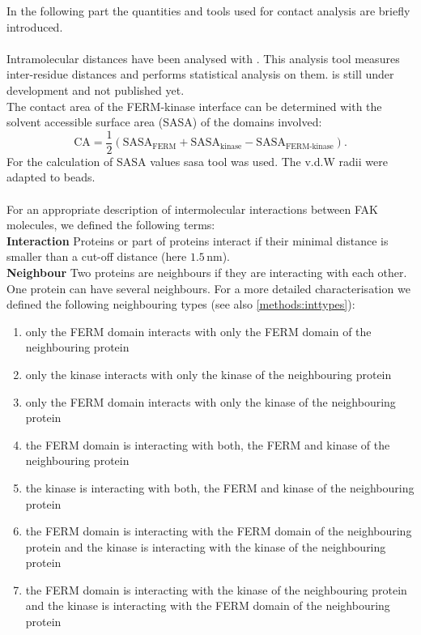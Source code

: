In the following part the quantities and tools used for contact analysis are briefly introduced.\\
\\
Intramolecular distances have been analysed with \conan{}. This analysis tool measures inter-residue distances and performs statistical analysis on them. \conan{} is still under development and not published yet.\\
The contact area of the FERM-kinase interface can be determined with the solvent accessible surface area (SASA) \autocite{sasaAlg} of the domains involved:
\begin{equation}
\text{CA} = \frac{1}{2} \left(\text{SASA}_\text{FERM} + \text{SASA}_\text{kinase} - \text{SASA}_\text{FERM-kinase}\right).
\end{equation}
For the calculation of SASA values \gromacs{} sasa tool was used. The v.d.W radii were adapted to \martini{} beads.\\
\\
For an appropriate description of intermolecular interactions between FAK molecules, we defined the following terms:\\
\textbf{Interaction} Proteins or part of proteins interact if their minimal distance is smaller than a cut-off distance (here $1.5\,\si{\nano\metre}$).\\
\textbf{Neighbour} Two proteins are neighbours if they are interacting with each other. One protein can have several neighbours. For a more detailed characterisation we defined the following neighbouring types (see also \autoref{methods:inttypes}):
\begin{enumerate}[label={type \theenumi:}, leftmargin=*]
	\setcounter{enumi}{0}
	\item only the FERM domain interacts with only the FERM domain of the neighbouring protein
	\item only the kinase interacts with only the kinase of the neighbouring protein
	\item only the FERM domain interacts with only the kinase of the neighbouring protein
	\item the FERM domain is interacting with both, the FERM and kinase of the neighbouring protein
	\item the kinase is interacting with both, the FERM and kinase of the neighbouring protein
	\item the FERM domain is interacting with the FERM domain of the neighbouring protein and the kinase is interacting with the kinase of the neighbouring protein
	\item the FERM domain is interacting with the kinase of the neighbouring protein and the kinase is interacting with the FERM domain of the neighbouring protein
\end{enumerate}
